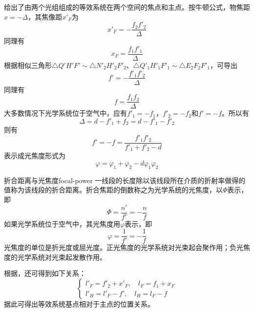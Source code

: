  给出了由两个光组组成的等效系统在两个空间的焦点和主点。按牛顿公式，物焦距$x=-\varDelta$，其焦像距$x'_F$为
\begin{equation}
x'_F=-\frac{f_2f'_2}{\varDelta}
\end{equation}
同理有
\begin{equation}
x_F=\frac{f_1f'_1}{\varDelta}
\end{equation}
根据相似三角形$\triangle Q'H'F'\sim\triangle N'_2H'_2F'_2$、$\triangle Q'_1H'_1F'_1\sim\triangle E_2F_2F'_1$，可导出
\begin{equation}
f'=-\frac{f'_1f'_2}{\varDelta}
\label{eq:combination-of-optical-systems-focal-length}
\end{equation}
同理有
\begin{equation}
f=\frac{f_1f_2}{\varDelta}
\end{equation}
大多数情况下光学系统位于空气中，应有$f'_1=-f_1$，$f'_2=-f_2$和$f'=-f$。所以有
\begin{equation}
\varDelta=d-f'_1+f_2=d-f'_1-f'_2
\end{equation}
则有
\begin{equation}
f'=-f=\frac{f'_1f'_2}{f'_1+f'_2-d}
\end{equation}
表示成光焦度形式为
\begin{equation}
\varphi=\varphi_1+\varphi_2-d\varphi_1\varphi_2
\end{equation}

\begin{definition}{折合距离与光焦度}{focal-power}
	一线段的长度除以该线段所在介质的折射率做得的值称为该线段的折合距离。折合焦距的倒数称之为光学系统的光焦度，以$\varPhi$表示，即
	\begin{equation}
	\varPhi=\frac{n'}{f'}=-\frac{n}{f}
	\end{equation}
	如果光学系统位于空气中，其光焦度用$\varphi$表示，即
	\begin{equation}
	\varphi=\frac{1}{f'}=-\frac{1}{f}
	\end{equation}
	光焦度的单位是折光度或屈光度。正光焦度的光学系统对光束起会聚作用；负光焦度的光学系统对光束起发散作用。
\end{definition}

根据，还可得到如下关系：
\begin{equation}
\begin{cases}
l'_F=f'_2+x'_F,\quad l_F=f_1+x_F\\
l'_H=l'_F-f',\quad l_H=l_F-f
\end{cases}
\end{equation}
据此可得出等效系统基点相对于主点的位置关系。

